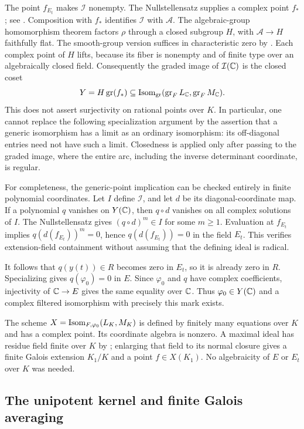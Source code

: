 The point $f_{E_t}$ makes $\mathcal I$ nonempty. The Nullstellensatz supplies
a complex point $f_*$; see \cite{StacksNullstellensatz}. Composition with
$f_*$ identifies $\mathcal I$ with $\mathcal A$. The algebraic-group
homomorphism theorem factors $\rho$ through a closed subgroup $H$, with
$\mathcal A\to H$ faithfully flat. The smooth-group version suffices
in characteristic zero by \cite[Theorems 1.72 and 3.23]{MilneAG2017}.
Each complex point of $H$ lifts, because its fiber is nonempty and of
finite type over an algebraically closed field. Consequently the graded
image of $\mathcal I(\mathbb C)$ is the closed coset
\[
 Y=H\operatorname{gr}(f_*)\subseteq
 \operatorname{Isom}_{\operatorname{gr}}(\operatorname{gr}_FL_{\mathbb C},\operatorname{gr}_FM_{\mathbb C}).
\]
This does not assert surjectivity on rational points over $K$. In
particular, one cannot replace the following specialization argument by
the assertion that a generic isomorphism has a limit as an ordinary
isomorphism: its off-diagonal entries need not have such a limit.
Closedness is applied only after passing to the graded image, where
the entire arc, including the inverse determinant coordinate, is regular.

For completeness, the generic-point implication can be checked entirely
in finite polynomial coordinates. Let $I$ define $\mathcal I$, and let
$d$ be its diagonal-coordinate map. If a polynomial $q$ vanishes on
$Y(\mathbb C)$, then $q\circ d$ vanishes on all complex solutions of $I$.
The Nullstellensatz gives $(q\circ d)^m\in I$ for some $m\geq1$.
Evaluation at $f_{E_t}$ implies $q(d(f_{E_t}))^m=0$, hence $q(d(f_{E_t}))=0$ in the
field $E_t$. This verifies extension-field containment without assuming
that the defining ideal is radical.

It follows that $q(y(t))\in R$ becomes zero in $E_t$, so it is already
zero in $R$. Specializing gives $q(\varphi_0)=0$ in $E$. Since $\varphi_0$ and
$q$ have complex coefficients, injectivity of $\mathbb C\to E$ gives the same
equality over $\mathbb C$. Thus $\varphi_0\in Y(\mathbb C)$ and a complex filtered
isomorphism with precisely this mark exists.

The scheme $X=\operatorname{Isom}_{F,\varphi_0}(L_K,M_K)$ is defined
by finitely many equations over $K$ and has a complex point. Its
coordinate algebra is nonzero. A maximal ideal has residue field finite
over $K$ by \cite{StacksNullstellensatz}; enlarging that field to its
normal closure gives a finite Galois extension $K_1/K$ and a point
$f\in X(K_1)$. No algebraicity of $E$ or $E_t$ over $K$ was needed.

\subsection{The unipotent kernel and finite Galois averaging}

